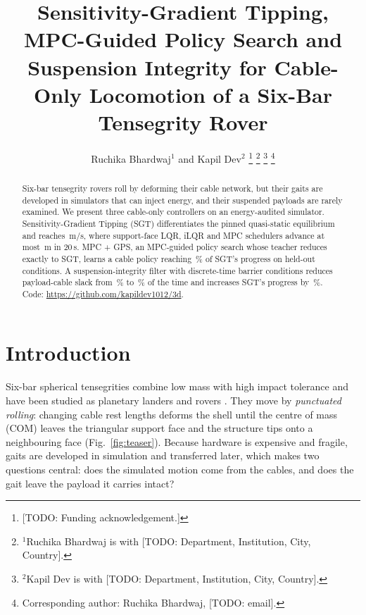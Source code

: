 \documentclass[letterpaper,10pt,conference]{IEEEtran}
\newcommand{\todo}[1]{\textcolor[rgb]{0.85,0,0}{[TODO: #1]}}
\newcommand{\coderepo}{\url{https://github.com/kapildev1012/3d}}
\begin{document}
\title{Sensitivity-Gradient Tipping, MPC-Guided Policy Search and Suspension
Integrity for Cable-Only Locomotion of a Six-Bar Tensegrity Rover}

\author{Ruchika Bhardwaj$^{1}$ and Kapil Dev$^{2}$%
\thanks{\todo{Funding acknowledgement.}}%
\thanks{$^{1}$Ruchika Bhardwaj is with \todo{Department, Institution, City, Country}.}%
\thanks{$^{2}$Kapil Dev is with \todo{Department, Institution, City, Country}.}%
\thanks{Corresponding author: Ruchika Bhardwaj, \todo{email}.}}

\maketitle

\begin{abstract}
Six-bar tensegrity rovers roll by deforming their cable network, but
their gaits are developed in simulators that can inject energy, and
their suspended payloads are rarely examined. We present three
cable-only controllers on an energy-audited simulator. Sensitivity-Gradient
Tipping (SGT) differentiates the pinned quasi-static equilibrium and
reaches \nSgtSpeed\,m/s, where support-face LQR, iLQR and MPC schedulers
advance at most \baseBestProgress\,m in 20\,s. MPC + GPS, an MPC-guided
policy search whose teacher reduces exactly to SGT, learns a cable
policy reaching \gpsRatio\,\% of SGT's progress on held-out conditions.
A suspension-integrity filter with discrete-time barrier conditions
reduces payload-cable slack from \shSlackOffSgt\,\% to \shSlackOnSgt\,\%
of the time and increases SGT's progress by \shProgGainSgt\,\%. Code:
\coderepo.
\end{abstract}

\section{Introduction}

Six-bar spherical tensegrities combine low mass with high impact
tolerance and have been studied as planetary landers and rovers
\cite{sabelhaus2015superball,littlefield2019kinodynamic}. They move by
\emph{punctuated rolling}: changing cable rest lengths deforms the shell
until the centre of mass (COM) leaves the triangular support face and
the structure tips onto a neighbouring face (Fig.~\ref{fig:teaser}).
Because hardware is expensive and fragile, gaits are developed in
simulation \cite{mirletz2015reality,zhang2017deep} and transferred
later, which makes two questions central: does the simulated motion come
from the cables, and does the gait leave the payload it carries intact?
\end{document}
